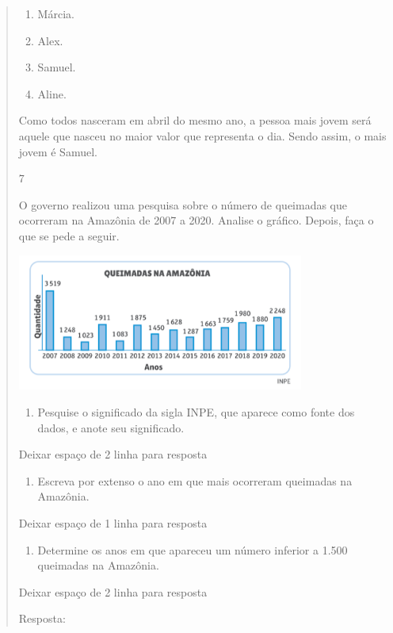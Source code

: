 \begin{mdframed}[linewidth=2pt,linecolor=salmao,roundcorner=2pt]
\begin{itemize}
{\begin{itemize}
\begin{escolha}
{\begin{quote}
{\begin{escolha}
{{{\begin{enumerate}
\item
  Márcia.
\item
  Alex.
\item
  Samuel.
\item
  Aline.
\end{enumerate}

Como todos nasceram em abril do mesmo ano, a pessoa mais jovem será
aquele que nasceu no maior valor que representa o dia. Sendo assim,
o mais jovem é Samuel.

\num{7}

O governo realizou uma pesquisa sobre o número de queimadas que
ocorreram na Amazônia de 2007 a 2020. Analise o gráfico. Depois, faça o que se pede a seguir.


\includegraphics[width=3.71154in,height=1.76937in]{media/image99.png}

\begin{enumerate}
\item
  Pesquise o significado da sigla INPE, que aparece como fonte dos dados,
  e anote seu significado.
\end{enumerate}

Deixar espaço de 2 linha para resposta

\begin{enumerate}
\item
  Escreva por extenso o ano em que mais ocorreram queimadas na Amazônia.
\end{enumerate}

Deixar espaço de 1 linha para resposta

\begin{enumerate}
\item
  Determine os anos em que apareceu um número inferior a 1.500 queimadas na
  Amazônia.
\end{enumerate}

Deixar espaço de 2 linha para resposta

Resposta:

}}}
\end{escolha}}
\end{quote}}
\end{escolha}
\end{itemize}}
\end{itemize}
\end{mdframed}
